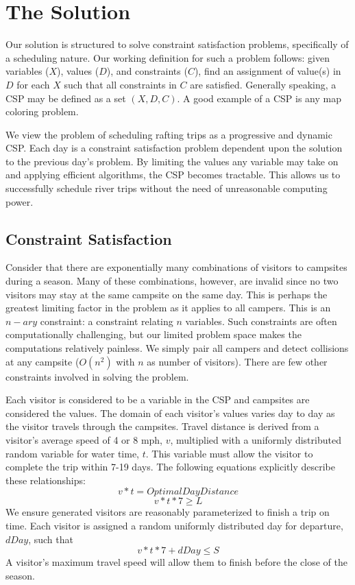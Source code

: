 \documentclass[11pt]{article} %
\begin{document}
\section{The Solution}
\label{sec:model-details}
Our solution is structured to solve constraint satisfaction problems,
specifically of a scheduling nature.  Our working definition for such a
problem follows: given variables ($X$), values ($D$),
and constraints ($C$), find an assignment of value(s) in $D$
for each $X$ such that all constraints in $C$ are satisfied.  Generally
speaking, a CSP may be defined as a set $(X,D,C)$.
A good example of a CSP is any map coloring problem\cite{DynamicCSP}.

We view the problem of scheduling rafting trips as a progressive and dynamic
CSP. Each day is a constraint satisfaction problem dependent upon the
solution to the previous day's problem.  By limiting the values any variable
may take on and applying efficient algorithms, the CSP becomes tractable.
This allows us to successfully schedule river trips without the need of unreasonable
computing power.

\subsection{Constraint Satisfaction}
\label{sec:csp}

Consider that there are exponentially
many combinations of  visitors to campsites during a season.  Many of
these combinations, however, are invalid since no two
 visitors may stay at the same campsite on the same day.  This is perhaps
the greatest limiting factor in the problem as it applies to all campers.
This is an $n-ary$
constraint: a constraint relating $n$ variables.  Such constraints are often
computationally challenging, but our limited problem space makes
the computations relatively painless.  We simply pair all campers and detect collisions at any
campsite ($O(n^2)$ with $n$ as
number of  visitors).  There are few other constraints involved in solving the problem.

Each visitor is considered to be a variable
in the CSP and campsites are considered the values.  The domain of
each visitor's values varies day to day as the visitor travels through the
campsites.  Travel distance is derived from
a visitor's average speed of 4 or 8 mph, $v$,  multiplied with a uniformly distributed
random variable for water time, $t$.  This variable must allow the visitor to complete the trip
within 7-19 days. The following equations explicitly
describe these relationships:
$$v*t=OptimalDayDistance$$
$$v*t*7\geq L$$
We ensure generated visitors are reasonably
parameterized to finish a trip on time.  Each visitor is assigned a random
uniformly distributed day for departure, $dDay$, such that
$$v*t*7+dDay\leq S$$
A visitor's maximum travel speed will allow them to finish before
the close of the season.
\end{document}
